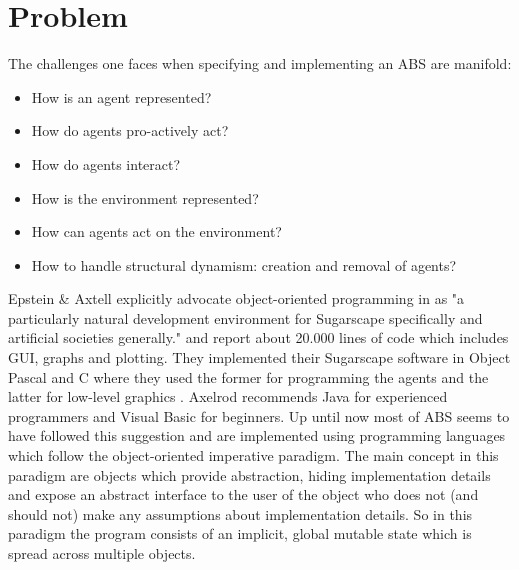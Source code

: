 \section{Problem}
The challenges one faces when specifying and implementing an ABS are manifold:

\begin{itemize}
	\item How is an agent represented?
	\item How do agents pro-actively act?
	\item How do agents interact?
	\item How is the environment represented?
	\item How can agents act on the environment?
	\item How to handle structural dynamism: creation and removal of agents?
\end{itemize}

Epstein \& Axtell explicitly advocate object-oriented programming in \cite{epstein_growing_1996} as "a particularly natural development environment for Sugarscape \cite{epstein_growing_1996} specifically and artificial societies generally." and report about 20.000 lines of code which includes GUI, graphs and plotting. They implemented their Sugarscape software in Object Pascal and C where they used the former for programming the agents and the latter for low-level graphics \cite{axtell_aligning_1996}. Axelrod \cite{axelrod_advancing_1997} recommends Java for experienced programmers and Visual Basic for beginners. Up until now most of ABS seems to have followed this suggestion and are implemented using programming languages which follow the object-oriented imperative paradigm.
The main concept in this paradigm are objects which provide abstraction, hiding implementation details and expose an abstract interface to the user of the object who does not (and should not) make any assumptions about implementation details. So in this paradigm the program consists of an implicit, global mutable state which is spread across multiple objects. 

